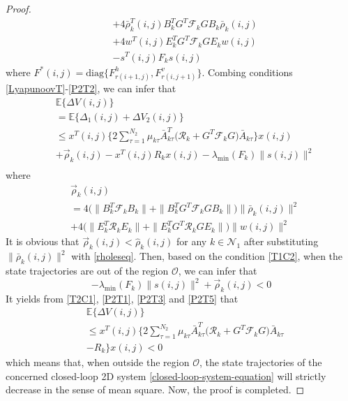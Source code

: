 \documentclass[journal,final,twocolumn]{IEEEtran}
\begin{document}
\begin{proof}
\begin{equation}
\begin{split}
			&+ 4\bar{\rho}^{T}_{k}(i,j)B^{T}_{k}G^{T}\mathcal{F}_{k}GB_{k}\bar{\rho}_{k}(i,j)\\
			&+4w^{T}(i,j)E^{T}_{k}G^{T}\mathcal{F}_{k}GE_{k}w(i,j)\\
			&-s^{T}(i,j)F_{k}s(i,j)
		\end{split}
	\end{equation}
	where $F^{*}(i,j)=\mathrm{diag}\{F^{h}_{r(i+1,j)},F^{v}_{r(i,j+1)}\}$. 
	Combing conditions \eqref{LyapunoovT}-\eqref{P2T2}, we can infer that 
	\begin{equation}\label{P2T3}
		\begin{split}
				&\mathbb{E}\{\varDelta V(i,j) \}\\
				&= \mathbb{E}\Big\{\varDelta_{1}(i,j)+\varDelta V_{2}(i,j) \Big\}\\
				&\leq x^{T}(i,j)\Big\{ 2\sum_{\tau =1}^{N_{2}}\mu_{k\tau }\bar{A}^{T}_{k\tau }\big(\mathcal{R}_{k} +G^{T}\mathcal{F}_{k}G\big)\bar{A}_{k\tau } \Big\} x(i,j) \\
				& +\vec{\rho}_{k}(i,j)-x^{T}(i,j)R_{k}x(i,j) - \lambda_{\mathrm{min}}(F_{k})\|s(i,j)\|^{2}\\
		\end{split}
	\end{equation}
	where
	\begin{equation*}
		\begin{split}
			&\vec{\rho}_{k}(i,j)\\
			&= 4\big(\|B^{T}_{k}\mathcal{F}_{k}B_{k}\|+ \|B^{T}_{k}G^{T}\mathcal{F}_{k}GB_{k}\|\big) \|\bar{\rho}_{k}(i,j)\|^{2} \\
			&+ 4\big(\|E^{T}_{k}\mathcal{R}_{k}E_{k}\|+ \|E^{T}_{k}G^{T}\mathcal{R}_{k}GE_{k}\|\big) \|w(i,j)\|^{2} 
		\end{split}
	\end{equation*}  
	It is obvious that $\vec{\rho}_{k}(i,j) < \hat{\rho}_{k}(i,j) $ for any $k\in\mathcal{N}_{1}$ after substituting $\|\bar{\rho}_{k}(i,j)\|^{2}$ with \eqref{rholeseq}. 
	Then, based on the condition \eqref{T1C2}, when the state trajectories are out of the region $\mathcal{O}$, we can infer that
	\begin{equation}\label{P2T5}
		-\lambda_{\mathrm{min}}(F_{k})\|s(i,j)\|^{2} + \vec{\rho}_{k}(i,j) <0
	\end{equation}
	It yields from \eqref{T2C1}, \eqref{P2T1}, \eqref{P2T3} and \eqref{P2T5} that 
	\begin{equation}
		\begin{split}
			&\mathbb{E}\{\varDelta V(i,j) \}\\
			&\leq x^{T}(i,j)\Big\{ 2\sum_{\tau =1}^{N_{2}}\mu_{k\tau }\bar{A}^{T}_{k\tau }\big(\mathcal{R}_{k} +G^{T}\mathcal{F}_{k}G \big)\bar{A}_{k\tau }\\ &-R_{k} \Big\} x(i,j)<0
		\end{split}
	\end{equation}
	which means that, when outside the region $\mathcal{O}$,  the state trajectories of the concerned closed-loop 2D system \eqref{closed-loop-system-equation} will strictly decrease in the sense of mean square. Now, the proof is completed.
	 
\end{proof}
\end{document}

